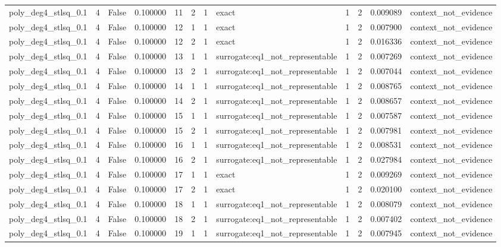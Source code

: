 \begin{tabular}{lrrrrrrlrrrl}
poly\_deg4\_stlsq\_0.1 & 4 & False & 0.100000 & 11 & 2 & 1 & exact & 1 & 2 & 0.009089 & context\_not\_evidence \\
poly\_deg4\_stlsq\_0.1 & 4 & False & 0.100000 & 12 & 1 & 1 & exact & 1 & 2 & 0.007900 & context\_not\_evidence \\
poly\_deg4\_stlsq\_0.1 & 4 & False & 0.100000 & 12 & 2 & 1 & exact & 1 & 2 & 0.016336 & context\_not\_evidence \\
poly\_deg4\_stlsq\_0.1 & 4 & False & 0.100000 & 13 & 1 & 1 & surrogate:eq1\_not\_representable & 1 & 2 & 0.007269 & context\_not\_evidence \\
poly\_deg4\_stlsq\_0.1 & 4 & False & 0.100000 & 13 & 2 & 1 & surrogate:eq1\_not\_representable & 1 & 2 & 0.007044 & context\_not\_evidence \\
poly\_deg4\_stlsq\_0.1 & 4 & False & 0.100000 & 14 & 1 & 1 & surrogate:eq1\_not\_representable & 1 & 2 & 0.008765 & context\_not\_evidence \\
poly\_deg4\_stlsq\_0.1 & 4 & False & 0.100000 & 14 & 2 & 1 & surrogate:eq1\_not\_representable & 1 & 2 & 0.008657 & context\_not\_evidence \\
poly\_deg4\_stlsq\_0.1 & 4 & False & 0.100000 & 15 & 1 & 1 & surrogate:eq1\_not\_representable & 1 & 2 & 0.007587 & context\_not\_evidence \\
poly\_deg4\_stlsq\_0.1 & 4 & False & 0.100000 & 15 & 2 & 1 & surrogate:eq1\_not\_representable & 1 & 2 & 0.007981 & context\_not\_evidence \\
poly\_deg4\_stlsq\_0.1 & 4 & False & 0.100000 & 16 & 1 & 1 & surrogate:eq1\_not\_representable & 1 & 2 & 0.008531 & context\_not\_evidence \\
poly\_deg4\_stlsq\_0.1 & 4 & False & 0.100000 & 16 & 2 & 1 & surrogate:eq1\_not\_representable & 1 & 2 & 0.027984 & context\_not\_evidence \\
poly\_deg4\_stlsq\_0.1 & 4 & False & 0.100000 & 17 & 1 & 1 & exact & 1 & 2 & 0.009269 & context\_not\_evidence \\
poly\_deg4\_stlsq\_0.1 & 4 & False & 0.100000 & 17 & 2 & 1 & exact & 1 & 2 & 0.020100 & context\_not\_evidence \\
poly\_deg4\_stlsq\_0.1 & 4 & False & 0.100000 & 18 & 1 & 1 & surrogate:eq1\_not\_representable & 1 & 2 & 0.008079 & context\_not\_evidence \\
poly\_deg4\_stlsq\_0.1 & 4 & False & 0.100000 & 18 & 2 & 1 & surrogate:eq1\_not\_representable & 1 & 2 & 0.007402 & context\_not\_evidence \\
poly\_deg4\_stlsq\_0.1 & 4 & False & 0.100000 & 19 & 1 & 1 & surrogate:eq1\_not\_representable & 1 & 2 & 0.007945 & context\_not\_evidence \\

\end{tabular}
